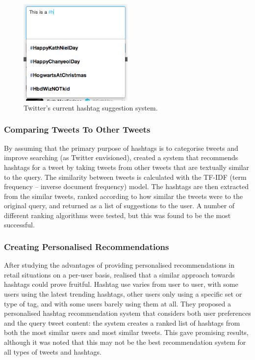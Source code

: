 \documentclass[12pt,a4paper]{article}
\begin{document}
\begin{figure}
    \centering
    \includegraphics[width=0.5\textwidth]{twittersuggest.png}
    \caption{Twitter's current hashtag suggestion system.\label{fig:twittersuggest}}
\end{figure}

\subsubsection{Comparing Tweets To Other Tweets}
By assuming that the primary purpose of hashtags is to categorise tweets and improve searching (as Twitter envisioned), \textcite{Zangerle:2011} created a system that recommends hashtags for a tweet by taking tweets from other tweets that are textually similar to the query. The similarity between tweets is calculated with the TF-IDF (term frequency -- inverse document frequency) model. The hashtags are then extracted from the similar tweets, ranked according to how similar the tweets were to the original query, and returned as a list of suggestions to the user. A number of different ranking algorithms were tested, but this was found to be the most successful.

\subsubsection{Creating Personalised Recommendations}
After studying the advantages of providing personalised recommendations in retail situations on a per-user basis, \textcite{Kywe:2012} realised that a similar approach towards hashtags could prove fruitful. Hashtag use varies from user to user, with some users using the latest trending hashtags, other users only using a specific set or type of tag, and with some users barely using them at all. They proposed a personalised hashtag recommendation system that considers both user preferences and the query tweet content: the system creates a ranked list of hashtags from both the most similar users and most similar tweets. This gave promising results, although it was noted that this may not be the best recommendation system for all types of tweets and hashtags.
\end{document}
